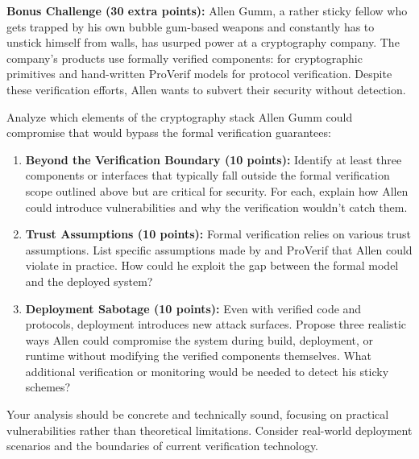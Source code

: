 \documentclass[10pt,a4paper,american]{exam}
\begin{document}
\begin{tcolorbox}[colframe=EarthBrown!30!white,colback=EarthBrown!5!white]
	\textbf{Bonus Challenge (30 extra points):} Allen Gumm, a rather sticky fellow who gets trapped by his own bubble gum-based weapons and constantly has to unstick himself from walls, has usurped power at a cryptography company. The company's products use formally verified components: \haclstar for cryptographic primitives and hand-written ProVerif models for protocol verification. Despite these verification efforts, Allen wants to subvert their security without detection.

	Analyze which elements of the cryptography stack Allen Gumm could compromise that would bypass the formal verification guarantees:
	\begin{enumerate}
		\item \textbf{Beyond the Verification Boundary (10 points):} Identify at least three components or interfaces that typically fall outside the formal verification scope outlined above but are critical for security. For each, explain how Allen could introduce vulnerabilities and why the verification wouldn't catch them.

		\item \textbf{Trust Assumptions (10 points):} Formal verification relies on various trust assumptions. List specific assumptions made by \haclstar and ProVerif that Allen could violate in practice. How could he exploit the gap between the formal model and the deployed system?

		\item \textbf{Deployment Sabotage (10 points):} Even with verified code and protocols, deployment introduces new attack surfaces. Propose three realistic ways Allen could compromise the system during build, deployment, or runtime without modifying the verified components themselves. What additional verification or monitoring would be needed to detect his sticky schemes?
	\end{enumerate}

	Your analysis should be concrete and technically sound, focusing on practical vulnerabilities rather than theoretical limitations. Consider real-world deployment scenarios and the boundaries of current verification technology.
\end{tcolorbox}
\end{document}
